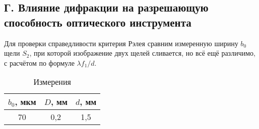 \documentclass[a4paper,12pt]{article}
\begin{document}
\subsection*{Г. Влияние дифракции на разрешающую способность оптического инструмента}

Для проверки справедливости критерия Рэлея сравним измеренную ширину $b_0$ щели $S_2$, при которой изображение двух щелей сливается, но всё ещё различимо, с расчётом по формуле $\lambda f_1/d$.

\FloatBarrier
\begin{table}[!h]
	\centering
	\caption{Измерения}
	\begin{tabular}{|c|c|c|} \hline
		$b_0$, мкм &	$D$, мм & $d$, мм \\ \hline
		70 &	0,2 & 1,5 \\ \hline
	\end{tabular}   
\end{table}
\FloatBarrier
\end{document}
